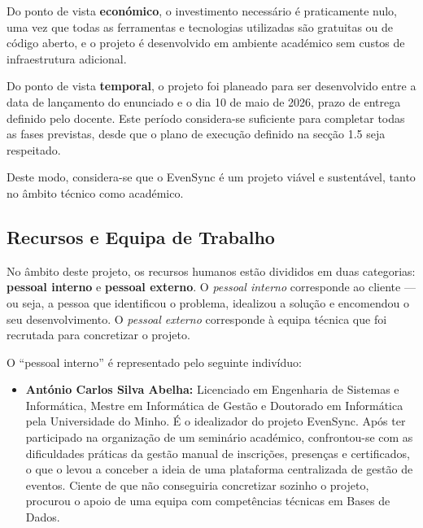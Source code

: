 \documentclass[runningheads]{llncs}
\begin{document}
                \vspace{0.3cm}
                Do ponto de vista \textbf{económico}, o investimento necessário é praticamente nulo, uma vez que todas as 
                ferramentas e tecnologias utilizadas são gratuitas ou de código aberto, e o projeto é desenvolvido 
                em ambiente académico sem custos de infraestrutura adicional.
                
                \vspace{0.3cm}
                Do ponto de vista \textbf{temporal}, o projeto foi planeado para ser desenvolvido entre a data de lançamento do
                enunciado e o dia 10 de maio de 2026, prazo de entrega definido pelo docente. Este período considera-se suficiente 
                para completar todas as fases previstas, desde que o plano de execução definido na secção 1.5 seja respeitado.
                
                Deste modo, considera-se que o EvenSync é um projeto viável e sustentável, tanto no âmbito técnico como académico.

                \subsection{Recursos e Equipa de Trabalho}
                No âmbito deste projeto, os recursos humanos estão divididos em duas categorias: \textbf{pessoal interno} e \textbf{pessoal externo}. O \textit{pessoal interno} corresponde ao cliente — ou seja, a pessoa que identificou o problema, idealizou a solução e encomendou o seu desenvolvimento. O \textit{pessoal externo} corresponde à equipa técnica que foi recrutada para concretizar o projeto.

                O ``pessoal interno'' é representado pelo seguinte indivíduo:
                \begin{itemize}
                        \item \textbf{António Carlos Silva Abelha:} Licenciado em Engenharia de Sistemas e Informática, Mestre em Informática de Gestão e Doutorado em Informática pela Universidade do Minho. É o idealizador do projeto EvenSync. Após ter participado na organização de um seminário académico, confrontou-se com as dificuldades práticas da gestão manual de inscrições, presenças e certificados, o que o levou a conceber a ideia de uma plataforma centralizada de gestão de eventos. Ciente de que não conseguiria concretizar sozinho o projeto, procurou o apoio de uma equipa com competências técnicas em Bases de Dados.
                \end{itemize}
\end{document}
